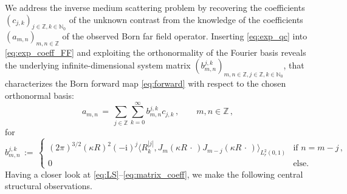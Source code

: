 \documentclass[11pt,a4paper]{article}
\theoremstyle{definition}
\theoremstyle{remark} \newtheorem{remark}[theorem]{Remark}
\numberwithin{equation}{section}
\numberwithin{figure}{section}
\numberwithin{algorithm}{section}
\numberwithin{table}{section}
\newcommand{\field}[1]{{\mathbb{#1}}}
\newcommand{\N}{\field{N}}
\newcommand{\Z}{\field{Z}}
\newcommand{\rmi}{\mathrm{i}}
\newcommand{\ph}{\,\cdot\,}
\begin{document}
We address the inverse medium scattering problem by recovering the coefficients $(c_{j,k})_{j\in\Z,k\in\N_0}$ of the unknown contrast from the knowledge of the coefficients $(a_{m,n})_{m,n\in\Z}$ of the observed Born far field operator.
Inserting \eqref{eq:exp_qc} into \eqref{eq:exp_coeff_FF} and exploiting the orthonormality of the Fourier basis reveals the underlying infinite-dimensional system matrix $(b_{m,n}^{j,k})_{m,n \in \Z, j\in\Z,k\in\N_0}$, that characterizes the Born forward map \eqref{eq:forward} with respect to the chosen orthonormal basis:
\begin{equation}
\label{eq:LS}
    a_{m,n}
    \,=\, \sum_{j\in\Z}\sum_{k=0}^\infty b_{m,n}^{j,k} c_{j,k}\,,
    \qquad m,n\in\Z\,,
\end{equation}
for
\begin{equation}
\label{eq:matrix_coeff}
 b^{j,k}_{m,n} 
 \,:=\, \begin{cases}
 (2\pi)^{3/2}(\kappa R)^2(-\rmi)^{j} \big\langle R^{|j|}_{k}, J_m(\kappa R\ph)J_{m-j}(\kappa R\ph) \big\rangle_{L^2_r(0,1)} & \text{if } n=m-j\,, \\[1mm]
 0 & \text{else}.
 \end{cases}
\end{equation}
Having a closer look at \eqref{eq:LS}--\eqref{eq:matrix_coeff}, we make the following central structural observations.
%
\end{document}
